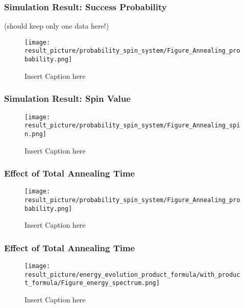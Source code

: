 \documentclass{beamer}
\begin{document}
\begin{frame}
	\frametitle{Simulation Result: Success Probability}
	(should keep only one data here!)
	\begin{figure}
		\centering
		\texttt{[image: result\_picture/probability\_spin\_system/Figure\_Annealing\_probability.png]}

		\caption{Insert Caption here}
	\end{figure}
\end{frame}

\begin{frame}
	\frametitle{Simulation Result: Spin Value}
	\begin{figure}
		\centering
		\texttt{[image: result\_picture/probability\_spin\_system/Figure\_Annealing\_spin.png]}
		\caption{Insert Caption here}
	\end{figure}
\end{frame}

\begin{frame}
	\frametitle{Effect of Total Annealing Time}
	\begin{figure}
		\centering
		\texttt{[image: result\_picture/probability\_spin\_system/Figure\_Annealing\_probability.png]}
		
		\caption{Insert Caption here}
	\end{figure}
\end{frame}

\begin{frame}
	\frametitle{Effect of Total Annealing Time}
	\begin{figure}
		\centering
		\texttt{[image: result\_picture/energy\_evolution\_product\_formula/with\_product\_formula/Figure\_energy\_spectrum.png]}
		
		\caption{Insert Caption here}
	\end{figure}
\end{frame}
\end{document}
